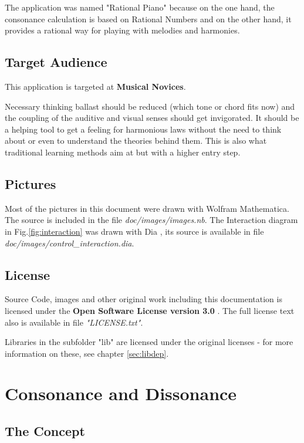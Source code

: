 \documentclass[12pt,a4paper,titlepage,oneside]{report}
\begin{document}
The application was named "Rational Piano" because on the one hand, the consonance calculation is based on Rational Numbers and on the other hand, it provides a rational way for playing with melodies and harmonies.


\section{Target Audience}

This application is targeted at \textbf{Musical Novices}.

Necessary thinking ballast should be reduced (which tone or chord fits now) and the coupling of the auditive and visual senses should get invigorated. It should be a helping tool to get a feeling for harmonious laws without the need to think about or even to understand the theories behind them. This is also what traditional learning methods aim at but with a higher entry step.


\section{Pictures}

Most of the pictures in this document were drawn with Wolfram Mathematica\textregistered \cite{bib:mathematica}. The source is included in the file \textit{doc/images/images.nb}. The Interaction diagram in Fig.\ref{fig:interaction} was drawn with Dia \cite{bib:dia}, its source is available in file \textit{doc/images/control\_interaction.dia}.


\section{License}

Source Code, images and other original work including this documentation is licensed under the \textbf{Open Software License version 3.0} \cite{bib:osl}. The full license text also is available in file \textit{"LICENSE.txt"}.

Libraries in the subfolder "lib" are licensed under the original licenses - for more information on these, see chapter \ref{sec:libdep}. 


\chapter{Consonance and Dissonance}
\label{chap:consonance}

\section{The Concept}
\end{document}
